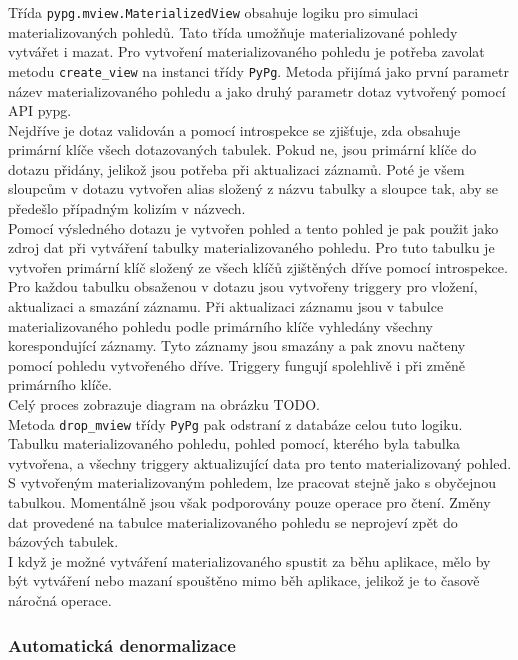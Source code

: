 \documentclass[ing,male,java,dept456]{diploma}						%
\begin{document}
Třída \lstinline[style=inlinepython]|pypg.mview.MaterializedView| obsahuje logiku pro simulaci materializovaných pohledů. Tato třída umožňuje materializované pohledy vytvářet i mazat. Pro vytvoření materializovaného pohledu je potřeba zavolat metodu \lstinline[style=inlinepython]|create_view| na instanci třídy \lstinline[style=inlinepython]|PyPg|. Metoda přijímá jako první parametr název materializovaného pohledu a jako druhý parametr dotaz vytvořený pomocí API pypg. \\
Nejdříve je dotaz validován a pomocí introspekce se zjišťuje, zda obsahuje primární klíče všech dotazovaných tabulek. Pokud ne, jsou primární klíče do dotazu přidány, jelikož jsou potřeba při aktualizaci záznamů. Poté je všem sloupcům v dotazu vytvořen alias složený z názvu tabulky a sloupce tak, aby se předešlo případným kolizím v názvech. \\
Pomocí výsledného dotazu je vytvořen pohled a tento pohled je pak použit jako zdroj dat při vytváření tabulky materializovaného pohledu. Pro tuto tabulku je vytvořen primární klíč složený ze všech klíčů zjištěných dříve pomocí introspekce. \\
Pro každou tabulku obsaženou v dotazu jsou vytvořeny triggery pro vložení, aktualizaci a smazání záznamu. Při aktualizaci záznamu jsou v tabulce materializovaného pohledu podle primárního klíče vyhledány všechny korespondující záznamy. Tyto záznamy jsou smazány a pak znovu načteny pomocí pohledu vytvořeného dříve. Triggery fungují spolehlivě i při změně primárního klíče. \\
Celý proces zobrazuje diagram na obrázku TODO. \\
Metoda \lstinline[style=inlinepython]|drop_mview| třídy \lstinline[style=inlinepython]|PyPg| pak odstraní z databáze celou tuto logiku. Tabulku materializovaného pohledu, pohled pomocí, kterého byla tabulka vytvořena, a všechny triggery aktualizující data pro tento materializovaný pohled. \\
S vytvořeným materializovaným pohledem, lze pracovat stejně jako s obyčejnou tabulkou. Momentálně jsou však podporovány pouze operace pro čtení. Změny dat provedené na tabulce materializovaného pohledu se neprojeví zpět do bázových tabulek. \\
I když je možné vytváření materializovaného spustit za běhu aplikace, mělo by být vytváření nebo mazaní spouštěno mimo běh aplikace, jelikož je to časově náročná operace. \\

\subsubsection{Automatická denormalizace}
\end{document}
